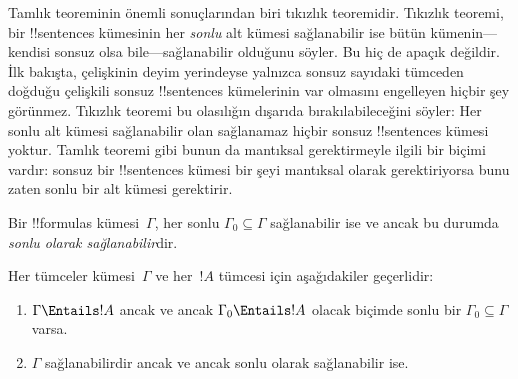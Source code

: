 \documentclass[../../../include/open-logic-section]{subfiles}
\begin{document}
      {}
      {}


Tamlık teoreminin önemli sonuçlarından biri tıkızlık teoremidir.
Tıkızlık teoremi, bir !!{sentence}s kümesinin her \emph{sonlu} alt
kümesi sağlanabilir ise bütün kümenin---kendisi sonsuz olsa
bile---sağlanabilir olduğunu söyler. Bu hiç de apaçık değildir. İlk
bakışta, çelişkinin deyim yerindeyse yalnızca sonsuz sayıdaki tümceden
doğduğu çelişkili sonsuz !!{sentence}s kümelerinin var olmasını
engelleyen hiçbir şey görünmez. Tıkızlık teoremi bu olasılığın dışarıda
bırakılabileceğini söyler: Her sonlu alt kümesi sağlanabilir olan
sağlanamaz hiçbir sonsuz !!{sentence}s kümesi yoktur. Tamlık teoremi
gibi bunun da mantıksal gerektirmeyle ilgili bir biçimi vardır: sonsuz
bir !!{sentence}s kümesi bir şeyi mantıksal olarak gerektiriyorsa bunu
zaten sonlu bir alt kümesi gerektirir.

\begin{defn}
  Bir !!{formula}s kümesi~$\Gamma$, her sonlu
  $\Gamma_0\subseteq\Gamma$ sağlanabilir ise ve ancak bu durumda
  \emph{sonlu olarak sağlanabilir}dir.
\end{defn}

\begin{thm}
Her tümceler kümesi~$\Gamma$ ve her~$!A$ tümcesi için aşağıdakiler
geçerlidir:
\begin{enumerate}
  \item $\Gamma\Entails !A$ ancak ve ancak $\Gamma_0\Entails !A$
    olacak biçimde sonlu bir $\Gamma_0\subseteq\Gamma$ varsa.
  \item $\Gamma$ sağlanabilirdir ancak ve ancak sonlu olarak
    sağlanabilir ise.
\end{enumerate}
\end{thm}
\end{document}
